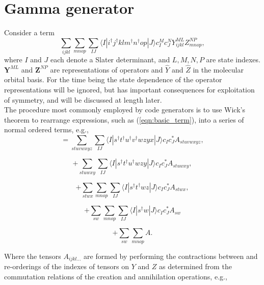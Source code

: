 \documentclass[12pt]{article}
\begin{document}
\section{Gamma generator}
Consider a term
\begin{equation}
\sum_{ijkl}\sum_{mnop} \sum_{IJ} \langle I | i^{\dagger}j^{\dagger}klm^{\dagger}n^{\dagger}op | J \rangle c^{M}_{I} c_{J}^{N} Y^{ML}_{ijkl}Z^{NP}_{mnop},
\label{eqn:basic_term}
\end{equation}
where $I$ and $J$ each denote a Slater determinant, and $L,M,N,P$ are state
indexes.  $\mathbf{Y}^{ML}$ and $\mathbf{Z}^{NP}$ are representations of
operators and $\hat{Y}$ and $\hat{Z}$ in the molecular orbital basis. For the time being
the state dependence of the operator representations will be ignored, but has important consequences
for exploitation of symmetry, and will be discussed at length later. \\ 

\noindent The procedure most commonly employed by code generators is to use Wick's theorem
to rearrange expressions, such as (\ref{eqn:basic_term}), into a series of normal ordered terms, e.g.,
\begin{equation*}
=\sum_{stuvwxyz} \sum_{IJ} \langle I | s^{\dagger}t^{\dagger}u^{\dagger}v^{\dagger}wzyx | J \rangle c_{I} c^{*}_{J} A_{stuvwxyz},
\end{equation*}

\begin{equation*}
+\sum_{stuwxy} \sum_{IJ} \langle I | s^{\dagger}t^{\dagger}u^{\dagger}wzy | J \rangle c_{I} c^{*}_{J} A_{stuwxy},
\end{equation*}

\begin{equation*}
+\sum_{stwx}\sum_{mnop} \sum_{IJ} \langle I | s^{\dagger}t^{\dagger}wz | J \rangle c_{I} c^{*}_{J} A_{stwx},
\end{equation*}

\begin{equation*}
+\sum_{sw}\sum_{mnop} \sum_{IJ} \langle I | s^{\dagger}w | J \rangle c_{I} c^{*}_{J} A_{sw}
\end{equation*}

\begin{equation*}
+\sum_{sw}\sum_{mnop}  A .
\end{equation*}

\noindent Where the tensors $A_{ijkl...}$ are formed by performing the 
contractions between and re-orderings of the indexes of tensors on $Y$ and $Z$ as 
determined from the commutation relations of the creation and annihilation operations, e.g.,
 
\end{document}
